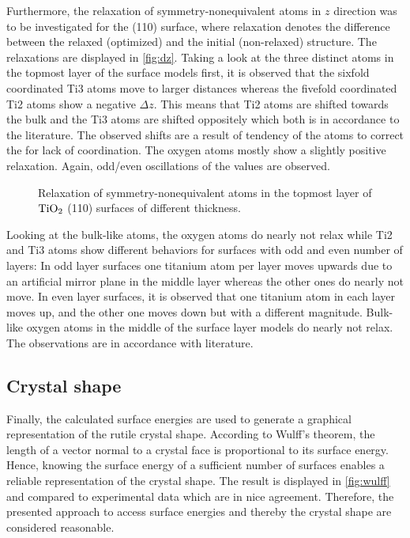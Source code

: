 \documentclass[a4paper,12pt,parskip=half]{scrartcl}
\begin{document}
Furthermore, the relaxation of symmetry-nonequivalent atoms in $ z $ direction was to be investigated for the (110) surface, where relaxation denotes the difference between the relaxed (optimized) and the initial (non-relaxed) structure. The relaxations are displayed in \autoref{fig:dz}. Taking a look at the three distinct atoms in the topmost layer of the surface models first, it is observed that the sixfold coordinated Ti3 atoms move to larger distances whereas the fivefold coordinated Ti2 atoms show a negative $ \Delta z $. This means that Ti2 atoms are shifted towards the bulk and the Ti3 atoms are shifted oppositely which both is in accordance to the literature.\autocite[]{rutile-surface-energy} The observed shifts are a result of tendency of the atoms to correct the for lack of coordination. The oxygen atoms mostly show a slightly positive relaxation. Again, odd/even oscillations of the values are observed.
%
\begin{figure}
	\centering
	
	\vspace{-20pt}
	\caption{Relaxation of symmetry-nonequivalent atoms in the topmost layer of $ \ce{TiO2} $ (110) surfaces of different thickness.}
	\label{fig:dz}
\end{figure}
%
Looking at the bulk-like atoms, the oxygen atoms do nearly not relax while Ti2 and Ti3 atoms show different behaviors for surfaces with odd and even number of layers: In odd layer surfaces one titanium atom per layer moves upwards due to an artificial mirror plane in the middle layer whereas the other ones do nearly not move. In even layer surfaces, it is observed that one titanium atom in each layer moves up, and the other one moves down but with a different magnitude. Bulk-like oxygen atoms in the middle of the surface layer models do nearly not relax. The observations are in accordance with literature.\autocite[]{rutile-surface-energy}
%
\subsection{Crystal shape}
%
Finally, the calculated surface energies are used to generate a graphical representation of the rutile crystal shape. According to Wulff's theorem, the length of a vector normal to a crystal face is proportional to its surface energy. Hence, knowing the surface energy of a sufficient number of surfaces enables a reliable representation of the crystal shape. The result is displayed in \autoref{fig:wulff} and compared to experimental data which are in nice agreement. Therefore, the presented approach to access surface energies and thereby the crystal shape are considered reasonable.
\end{document}
